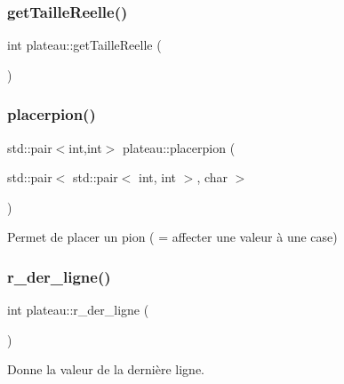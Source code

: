 \subsubsection{\texorpdfstring{get\+Taille\+Reelle()}{getTailleReelle()}}
{\footnotesize\ttfamily int plateau\+::get\+Taille\+Reelle (\begin{DoxyParamCaption}{ }\end{DoxyParamCaption})\hspace{0.3cm}{\ttfamily [inline]}}

\mbox{\label{classplateau_ab7e3c4e4727aed1b116a2f472ee98fc5}} 
\subsubsection{\texorpdfstring{placerpion()}{placerpion()}}
{\footnotesize\ttfamily std\+::pair$<$int,int$>$ plateau\+::placerpion (\begin{DoxyParamCaption}\item[{std\+::pair$<$ std\+::pair$<$ int, int $>$, char $>$}]{ }\end{DoxyParamCaption})}



Permet de placer un pion ( = affecter une valeur à une case) 

\mbox{\label{classplateau_a7dc94d2ffd474bd7871deb25d9af8091}} 
\subsubsection{\texorpdfstring{r\+\_\+der\+\_\+ligne()}{r\_der\_ligne()}}
{\footnotesize\ttfamily int plateau\+::r\+\_\+der\+\_\+ligne (\begin{DoxyParamCaption}{ }\end{DoxyParamCaption})\hspace{0.3cm}{\ttfamily [inline]}}



Donne la valeur de la dernière ligne. 

\mbox{\label{classplateau_ae3ef298374f71fb9bcdcf7c878ba9be8}} 
